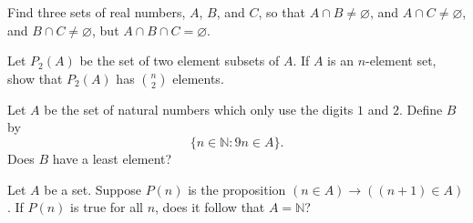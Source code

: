 \documentclass[12pt]{midterm}
\begin{document}
\begin{exam}
\begin{problem}[350]
Find three sets of real numbers, $A$, $B$, and $C$, so that $A \cap B
\neq \varnothing$, and $A \cap C
\neq \varnothing$, and $B \cap C
\neq \varnothing$, but $A \cap B \cap C = \varnothing$.
\end{problem}

\begin{solution}\begin{solutiontext}
\end{solutiontext}\end{solution}

\begin{problem}[350]
Let $P_2(A)$ be the set of two element subsets of $A$.  If $A$ is an
$n$-element set, show that $P_2(A)$ has $\displaystyle\binom{n}{2}$ elements.
\end{problem}

\begin{solution}\begin{solutiontext}
\end{solutiontext}\end{solution}

\begin{problem}[350]
Let $A$ be the set of natural numbers which only use the digits $1$
and $2$.  Define $B$ by
$$
\{ n \in \mathbb{N} : 9n \in A \}.
$$
Does $B$ have a least element?  %
% 

\end{problem}

\begin{solution}\begin{solutiontext}
\end{solutiontext}\end{solution}

\begin{problem}[350]
Let $A$ be a set.  Suppose $P(n)$ is the proposition $(n \in A)
\rightarrow ((n+1) \in A)$.  If $P(n)$ is true for all $n$, does it
follow that $A = \mathbb{N}$?
\end{problem}

\begin{solution}\begin{solutiontext}
\end{solutiontext}\end{solution}


\end{exam}
\end{document}
